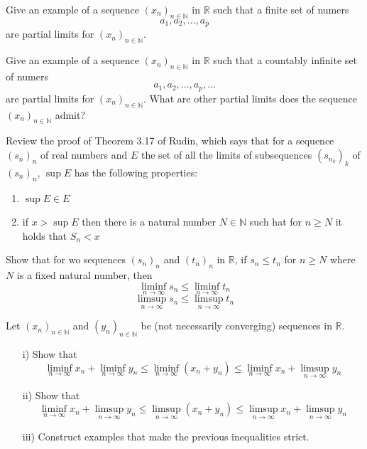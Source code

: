 \documentclass[11pt]{article}%
\newcommand{\R}{\mathbb{R}}
\newcommand{\N}{\mathbb{N}}
\begin{document}
\begin{Exercise}[title= *]  
Give an example of a sequence $(x_n)_{n\in\mathbb{N}}$ in $\mathbb R$ such that a finite set of numers $$a_1,a_2,\ldots,a_p$$ are partial limits for $(x_n)_{n\in\mathbb{N}}$.
\end{Exercise}

\begin{Exercise}[title= **]
Give an example of a sequence $(x_n)_{n\in\mathbb{N}}$ in $\mathbb R$ such that a countably infinite set of numers $$a_1,a_2,\ldots,a_p, \ldots$$ are partial limits for $(x_n)_{n\in\mathbb{N}}$. What are other partial limits does the sequence $(x_n)_{n\in\mathbb{N}}$ admit?
\end{Exercise}

\begin{Exercise}[title=**]
	Review the proof of Theorem 3.17 of Rudin, which says that for a sequence $(s_n)_n$ of real numbers and $E$ the set of all the limits of subsequences $(s_{n_k})_k$ of $(s_n)_n$, $\sup E$ has the following properties:
	\begin{enumerate}
		\item $\sup E \in E$
		\item if $x>\sup E$ then there is a natural number $N\in\N$ such hat for $n\geq N$ it holds that $S_n<x$
	\end{enumerate}
\end{Exercise}

\begin{Exercise}[title=*$\dagger$]
	Show that for wo sequences $(s_n)_n$ and $(t_n)_n$ in $\R$, if $s_n\leq t_n$ for $n\geq N$ where $N$ is a fixed natural number, then
	$$\liminf_{n\to\infty} s_n \leq \liminf_{n\to\infty} t_n$$
	$$\limsup_{n\to\infty} s_n \leq \limsup_{n\to\infty} t_n$$
\end{Exercise}

\begin{Exercise}[title= **]
Let $(x_n)_{n\in\mathbb{N}}$ and $(y_n)_{n\in\mathbb{N}}$ be (not necessarily converging) sequences in $\mathbb{R}$.
\begin{itemize}
	\item[i)] Show that $$\liminf\limits_{n\to\infty}x_n+\liminf\limits_{n\to\infty}y_n\leq\liminf\limits_{n\to\infty}(x_n+y_n)\leq \liminf\limits_{n\to\infty}x_n+\limsup\limits_{n\to\infty}y_n$$
	\item[ii)] Show that $$\liminf\limits_{n\to\infty}x_n+\limsup\limits_{n\to\infty}y_n\leq\limsup\limits_{n\to\infty}(x_n+y_n)\leq \limsup\limits_{n\to\infty}x_n+\limsup\limits_{n\to\infty}y_n$$
	\item[iii)] Construct examples that make the previous inequalities strict.
\end{itemize}
\end{Exercise}
\end{document}
